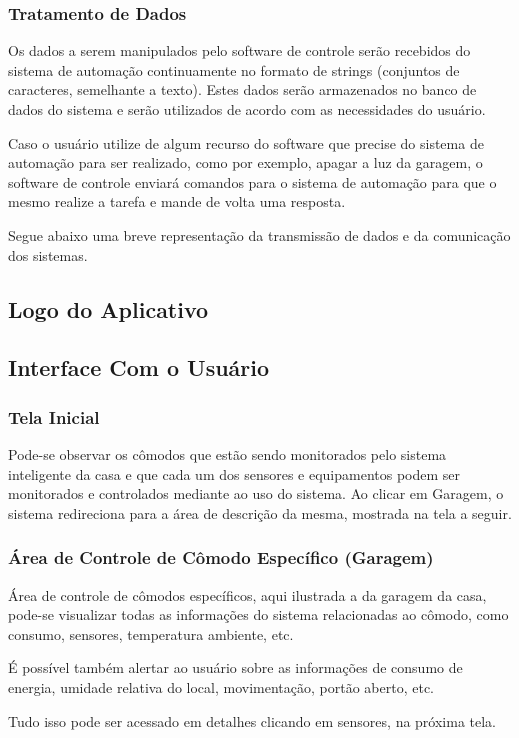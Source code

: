 \subsubsection{Tratamento de Dados}
\par Os dados a serem manipulados pelo software de controle serão recebidos do sistema de automação continuamente no formato de strings (conjuntos de caracteres, semelhante a texto). Estes dados serão armazenados no banco de dados do sistema e serão utilizados de acordo com as necessidades do usuário.
\par Caso o usuário utilize de algum recurso do software que precise do sistema de automação para ser realizado, como por exemplo, apagar a luz da garagem, o software de controle enviará comandos para o sistema de automação para que o mesmo realize a tarefa e mande de volta uma resposta.
\par Segue abaixo uma breve representação da transmissão de dados e da comunicação dos sistemas.

\subsection{Logo do Aplicativo}


\subsection{Interface Com o Usuário}

\subsubsection{Tela Inicial}


\par Pode-se observar os cômodos que estão sendo monitorados pelo sistema inteligente da casa e que cada um dos sensores e equipamentos podem ser monitorados e controlados mediante ao uso do sistema. Ao clicar em Garagem, o sistema redireciona para a área de descrição da mesma, mostrada na tela a seguir.

\subsubsection{Área de Controle de Cômodo Específico (Garagem)}


\par Área de controle de cômodos específicos, aqui ilustrada a da garagem da casa, pode-se visualizar todas as informações do sistema relacionadas ao cômodo, como consumo, sensores, temperatura ambiente, etc.
\par É possível também alertar ao usuário sobre as informações de consumo de energia, umidade relativa do local, movimentação, portão aberto, etc.
\par Tudo isso pode ser acessado em detalhes clicando em sensores, na próxima tela.

